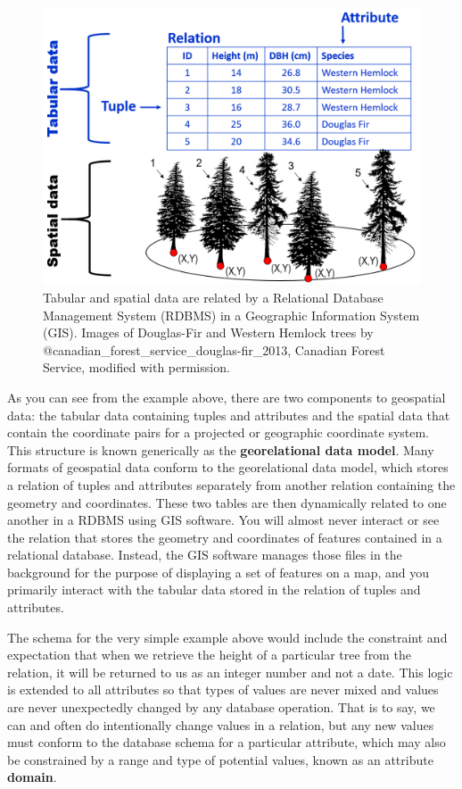 \documentclass[
]{book}
\begin{document}
\begin{figure}
\includegraphics[width=0.75\linewidth]{images/05-tabular-data-spatial-data} \caption{Tabular and spatial data are related by a Relational Database Management System (RDBMS) in a Geographic Information System (GIS). Images of Douglas-Fir and Western Hemlock trees by @canadian_forest_service_douglas-fir_2013, Canadian Forest Service, modified with permission.}\label{fig:5-tabular-data-spatial-data}
\end{figure}

As you can see from the example above, there are two components to geospatial data: the tabular data containing tuples and attributes and the spatial data that contain the coordinate pairs for a projected or geographic coordinate system. This structure is known generically as the \textbf{georelational data model}. Many formats of geospatial data conform to the georelational data model, which stores a relation of tuples and attributes separately from another relation containing the geometry and coordinates. These two tables are then dynamically related to one another in a RDBMS using GIS software. You will almost never interact or see the relation that stores the geometry and coordinates of features contained in a relational database. Instead, the GIS software manages those files in the background for the purpose of displaying a set of features on a map, and you primarily interact with the tabular data stored in the relation of tuples and attributes.

The schema for the very simple example above would include the constraint and expectation that when we retrieve the height of a particular tree from the relation, it will be returned to us as an integer number and not a date. This logic is extended to all attributes so that types of values are never mixed and values are never unexpectedly changed by any database operation. That is to say, we can and often do intentionally change values in a relation, but any new values must conform to the database schema for a particular attribute, which may also be constrained by a range and type of potential values, known as an attribute \textbf{domain}.
\end{document}

